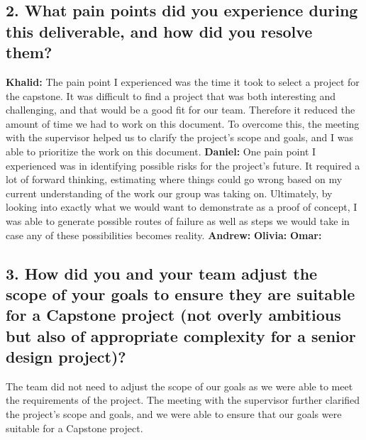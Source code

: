 \documentclass{article}
\begin{document}
\subsection*{2. What pain points did you experience during this deliverable, and how did you resolve them?}
\bigskip
\textbf{Khalid:} The pain point I experienced was the time it took to select a project for the capstone. It was difficult to find a project that was both interesting and challenging, and that would be a good fit for our team. Therefore it reduced the amount of time we had to work on this document. To overcome this, the meeting with the supervisor helped us to clarify the project's scope and goals, and I was able to prioritize the work on this document.
\newline
\newline
\textbf{Daniel:} One pain point I experienced was in identifying possible risks for the project's future. It required a lot of forward thinking, estimating where things could go wrong based on my current understanding of the work our group was taking on. Ultimately, by looking into exactly what we would want to demonstrate as a proof of concept, I was able to generate possible routes of failure as well as steps we would take in case any of these possibilities becomes reality.
\newline
\newline
\textbf{Andrew:}
\newline
\newline
\textbf{Olivia:}
\newline
\newline
\textbf{Omar:}


\subsection*{3. How did you and your team adjust the scope of your goals to ensure they are suitable for a Capstone project (not overly ambitious but also of appropriate complexity for a senior design project)?}
The team did not need to adjust the scope of our goals as we were able to meet the requirements of the project. The meeting with the supervisor further clarified the project's scope and goals, and we were able to ensure that our goals were suitable for a Capstone project.
\end{document}

